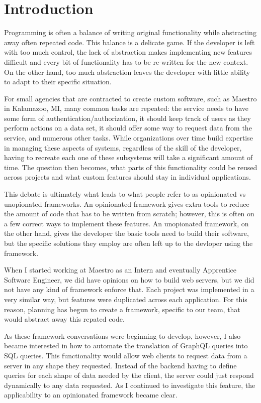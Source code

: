 \section{Introduction}

Programming is often a balance of writing original functionality while abstracting away often repeated code.  This balance is a delicate game.  If the developer is left with too much control, the lack of abstraction makes implementing new features difficult and every bit of functionality has to be re-written for the new context.  On the other hand, too much abstraction leaves the developer with little ability to adapt to their specific situation.

For small agencies that are contracted to create custom software, such as Maestro in Kalamazoo, MI, many common tasks are repeated:  the service needs to have some form of authentication/authorization, it should keep track of users as they perform actions on a data set, it should offer some way to request data from the service, and numerous other tasks.  While organizations over time build expertise in managing these aspects of systems, regardless of the skill of the developer, having to recreate each one of these subsystems will take a significant amount of time.  The question then becomes, what parts of this functionality could be reused across projects and what custom features should stay in individual applications.

This debate is ultimately what leads to what people refer to as opinionated vs unopionated frameworks.  An opinionated framework gives extra tools to reduce the amount of code that has to be written from scratch; however, this is often on a few correct ways to implement these features.  An unopionated framework, on the other hand, gives the developer the basic tools need to build their software, but the specific solutions they employ are often left up to the devloper using the framework.

When I started working at Maestro as an Intern and eventually Apprentice Software Engineer, we did have opinions on how to build web servers, but we did not have any kind of framework enforce that.  Each project was implemented in a very similar way, but features were duplicated across each application.  For this reason, planning has begun to create a framework, specific to our team, that would abstract away this repated code.

As these framework conversations were beginning to develop, however, I also became interested in how to automate the translation of GraphQL queries into SQL queries.  This functionality would allow web clients to request data from a server in any shape they requested.  Instead of the backend having to define queries for each shape of data needed by the client, the server could just respond dynamically to any data requested.  As I continued to investigate this feature, the applicability to an opinionated framework became clear.

